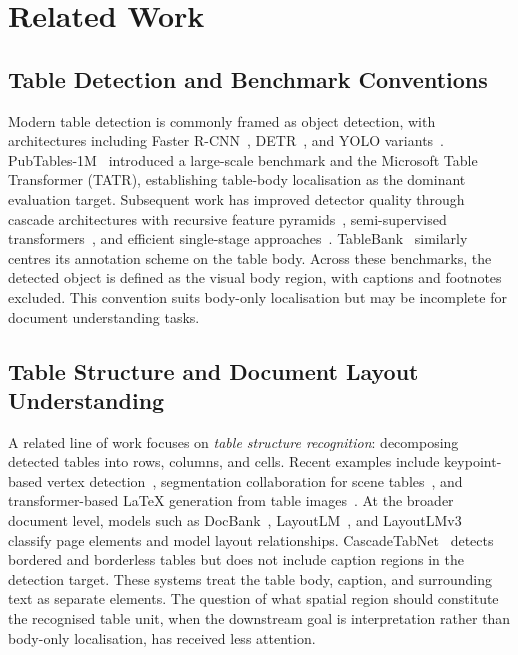 \documentclass[pdflatex,sn-mathphys-num,iicol]{sn-jnl}
\begin{document}
\section{Related Work}\label{sec:related}

\subsection{Table Detection and Benchmark Conventions}\label{sec:related_detection}

Modern table detection is commonly framed as object detection, with architectures
including Faster R-CNN~\cite{ren2017faster}, DETR~\cite{carion2020detr}, and YOLO
variants~\cite{redmon2016yolo,zhang2022yolotable}.
PubTables-1M~\cite{smock2022pubtables} introduced a large-scale benchmark and the
Microsoft Table Transformer (TATR), establishing table-body localisation as the
dominant evaluation target. Subsequent work has improved detector quality through
cascade architectures with recursive feature
pyramids~\cite{hashmi2021castabdetectors}, semi-supervised
transformers~\cite{ehsan2024semisupervised}, and efficient single-stage
approaches~\cite{song2024robust}. TableBank~\cite{li2020tablebank} similarly centres
its annotation scheme on the table body. Across these benchmarks, the detected
object is defined as the visual body region, with captions and footnotes excluded.
This convention suits body-only localisation but may be incomplete for document
understanding tasks.

\subsection{Table Structure and Document Layout Understanding}\label{sec:related_structure}

A related line of work focuses on \emph{table structure recognition}: decomposing
detected tables into rows, columns, and cells. Recent examples include
keypoint-based vertex detection~\cite{hong2025vertexnet}, segmentation collaboration
for scene tables~\cite{wang2023scene}, and transformer-based LaTeX generation from
table images~\cite{kayal2022tables}. At the broader document level, models such as
DocBank~\cite{li2020docbank}, LayoutLM~\cite{xu2020layoutlm}, and
LayoutLMv3~\cite{huang2022layoutlmv3} classify page elements and model layout
relationships. CascadeTabNet~\cite{prasad2020cascadetabnet} detects bordered and
borderless tables but does not include caption regions in the detection target.
These systems treat the table body, caption, and surrounding text as separate
elements. The question of what spatial region should constitute the recognised table
unit, when the downstream goal is interpretation rather than body-only localisation,
has received less attention.
\end{document}
